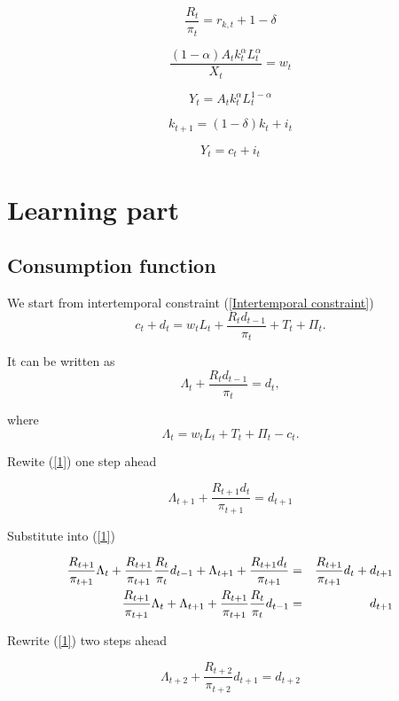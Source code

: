 \documentclass{article}
\begin{document}
\[
\frac{R_{t}}{\pi _{t}}=r_{k,t}+1-\delta 
\]

\[
\frac{\left( 1-\alpha \right) A_{t}k_{t}^{\alpha }L_{t}^{\alpha }}{X_{t}}%
=w_{t} 
\]

\[
Y_{t}=A_{t}k_{t}^{\alpha }L_{t}^{1-\alpha } 
\]

\[
k_{t+1}=\left( 1-\delta \right) k_{t}+i_{t} 
\]

\[
Y_{t}=c_{t}+i_{t} 
\]

\section{Learning part}

\subsection{Consumption function}

We start from intertemporal constraint (\ref{Intertemporal constraint})%
\[
c_{t}+d_{t}=w_{t}L_{t}+\frac{R_{t}d_{t-1}}{\pi _{t}}+T_{t}+\Pi _{t}. 
\]

It can be written as%
\begin{equation}
\Lambda _{t}+\frac{R_{t}d_{t-1}}{\pi _{t}}=d_{t},  \label{1}
\end{equation}

where%
\[
\Lambda _{t}=w_{t}L_{t}+T_{t}+\Pi _{t}-c_{t}. 
\]

Rewite (\ref{1}) one step ahead

\begin{equation}
\Lambda _{t+1}+\frac{R_{t+1}d_{t}}{\pi _{t+1}}=d_{t+1}  \label{2}
\end{equation}

Substitute into (\ref{1})

\begin{eqnarray}
\frac{R_{t+1}}{\pi _{t+1}}\Lambda _{t}+\frac{R_{t+1}}{\pi _{t+1}}\frac{R_{t}%
}{\pi _{t}}d_{t-1}+\Lambda _{t+1}+\frac{R_{t+1}d_{t}}{\pi _{t+1}} &=&\frac{%
R_{t+1}}{\pi _{t+1}}d_{t}+d_{t+1}  \nonumber \\
\frac{R_{t+1}}{\pi _{t+1}}\Lambda _{t}+\Lambda _{t+1}+\frac{R_{t+1}}{\pi
_{t+1}}\frac{R_{t}}{\pi _{t}}d_{t-1} &=&d_{t+1}  \label{3}
\end{eqnarray}

Rewrite (\ref{1}) two steps ahead

\begin{equation}
\Lambda _{t+2}+\frac{R_{t+2}}{\pi _{t+2}}d_{t+1}=d_{t+2}  \label{4}
\end{equation}
\end{document}
